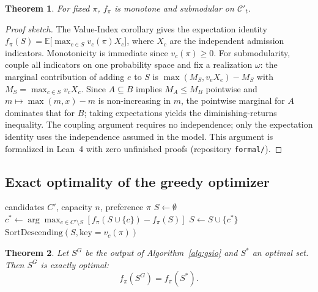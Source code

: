 \documentclass[11pt,a4paper]{article}
\newtheorem{theorem}{Theorem}[section]
\begin{document}
\begin{theorem}\label{thm:submodular}
For fixed $\pi$, $f_\pi$ is monotone and submodular on $\mathcal{C}'_t$.
\end{theorem}

\begin{proof}[Proof sketch]
The Value-Index corollary gives the expectation identity $f_\pi(S)=\mathbb{E}\big[\max_{c\in S} v_c(\pi) X_c\big]$, where $X_c$ are the independent admission indicators. Monotonicity is immediate since $v_c(\pi)\ge 0$. For submodularity, couple all indicators on one probability space and fix a realization $\omega$: the marginal contribution of adding $e$ to $S$ is $\max(M_S, v_e X_e)-M_S$ with $M_S=\max_{c\in S} v_c X_c$. Since $A\subseteq B$ implies $M_A\le M_B$ pointwise and $m\mapsto \max(m,x)-m$ is non-increasing in $m$, the pointwise marginal for $A$ dominates that for $B$; taking expectations yields the diminishing-returns inequality. The coupling argument requires no independence; only the expectation identity uses the independence assumed in the model. This argument is formalized in Lean~4 with zero unfinished proofs (repository \texttt{formal/}).
\end{proof}

\subsection{Exact optimality of the greedy optimizer}

\begin{algorithm}[H]
\caption{GSIO: Greedy Submodular Optimizer with Internal Ordering}
\label{alg:gsio}
\begin{algorithmic}[1]
\Require candidates $C'$, capacity $n$, preference $\pi$
\State $S \gets \emptyset$
  \State $c^* \gets \arg\max_{c \in C' \setminus S} \left[ f_\pi(S \cup \{c\}) - f_\pi(S) \right]$
  \State $S \gets S \cup \{c^*\}$
\EndFor
\State \Return $\text{SortDescending}(S, \text{key} = v_c(\pi))$
\end{algorithmic}
\end{algorithm}

\begin{theorem}\label{thm:greedy}
Let $S^G$ be the output of Algorithm~\ref{alg:gsio} and $S^*$ an optimal set. Then $S^G$ is exactly optimal:
\[
f_\pi(S^G) = f_\pi(S^*).
\]
\end{theorem}
\end{document}
